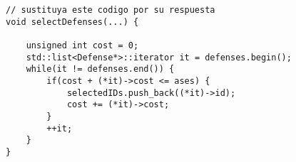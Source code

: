 \begin{lstlisting}
// sustituya este codigo por su respuesta
void selectDefenses(...) {

    unsigned int cost = 0;
    std::list<Defense*>::iterator it = defenses.begin();
    while(it != defenses.end()) {
        if(cost + (*it)->cost <= ases) {
            selectedIDs.push_back((*it)->id);
            cost += (*it)->cost;
        }
        ++it;
    }
}
\end{lstlisting}
